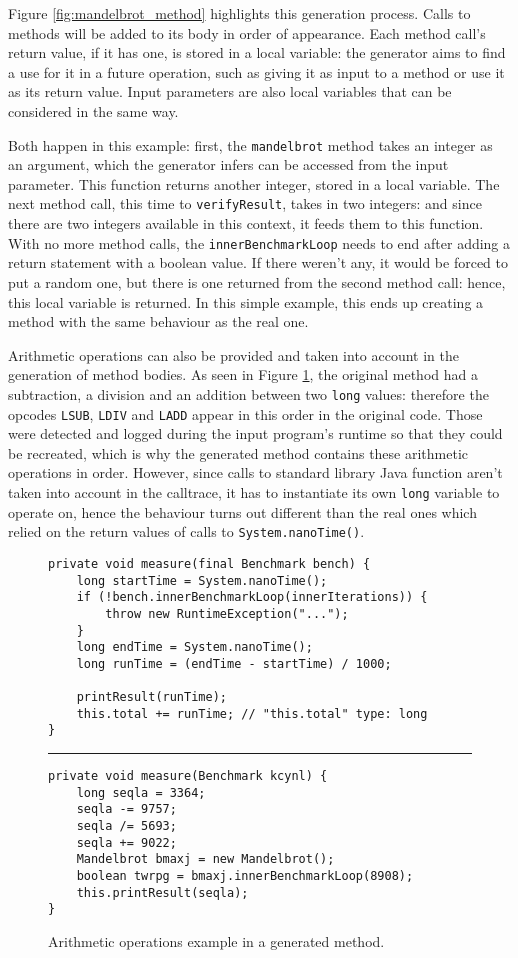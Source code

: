 \documentclass[12pt]{article}
\begin{document}
Figure \ref{fig:mandelbrot_method} highlights this generation process. Calls to methods will be added to its body in order of appearance. Each method call's return value, if it has one, is stored in a local variable: the generator aims to find a use for it in a future operation, such as giving it as input to a method or use it as its return value. Input parameters are also local variables that can be considered in the same way. 

Both happen in this example: first, the \texttt{mandelbrot} method takes an integer as an argument, which the generator infers can be accessed from the input parameter. This function returns another integer, stored in a local variable. The next method call, this time to \texttt{verifyResult}, takes in two integers: and since there are two integers available in this context, it feeds them to this function. With no more method calls, the \texttt{innerBenchmarkLoop} needs to end after adding a return statement with a boolean value. If there weren't any, it would be forced to put a random one, but there is one returned from the second method call: hence, this local variable is returned. In this simple example, this ends up creating a method with the same behaviour as the real one.

\bigskip
Arithmetic operations can also be provided and taken into account in the generation of method bodies. As seen in Figure \ref{fig:mandelbrot_method_operations}, the original method had a subtraction, a division and an addition between two \texttt{long} values: therefore the opcodes \texttt{LSUB}, \texttt{LDIV} and \texttt{LADD} appear in this order in the original code. Those were detected and logged during the input program's runtime so that they could be recreated, which is why the generated method contains these arithmetic operations in order. However, since calls to standard library Java function aren't taken into account in the calltrace, it has to instantiate its own \texttt{long} variable to operate on, hence the behaviour turns out different than the real ones which relied on the return values of calls to \texttt{System.nanoTime()}. 

\begin{figure}
\begin{lstlisting}
private void measure(final Benchmark bench) {
	long startTime = System.nanoTime();
	if (!bench.innerBenchmarkLoop(innerIterations)) {
		throw new RuntimeException("...");
	}
	long endTime = System.nanoTime();
	long runTime = (endTime - startTime) / 1000;
	
	printResult(runTime);
	this.total += runTime; // "this.total" type: long
}
\end{lstlisting}
\hrule
\begin{lstlisting}
private void measure(Benchmark kcynl) {
	long seqla = 3364;
	seqla -= 9757;
	seqla /= 5693;
	seqla += 9022;
	Mandelbrot bmaxj = new Mandelbrot();
	boolean twrpg = bmaxj.innerBenchmarkLoop(8908);
	this.printResult(seqla);
}
\end{lstlisting}
\captionsetup{justification=centering}
\caption{Arithmetic operations example in a generated method.}
\label{fig:mandelbrot_method_operations}
\end{figure}
\end{document}

